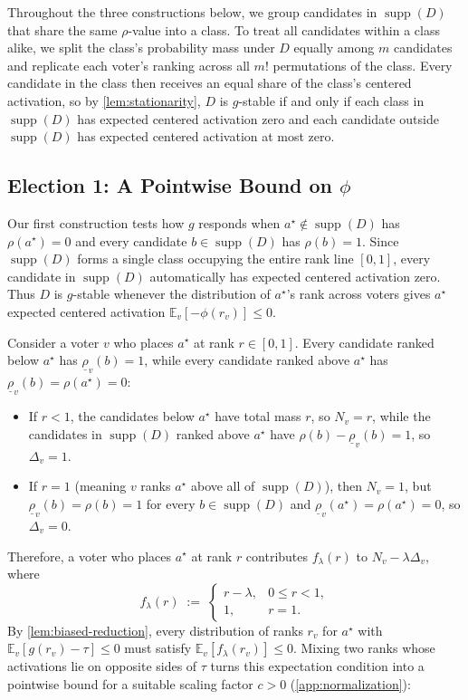 \documentclass[11pt]{article}
\numberwithin{equation}{section}
\theoremstyle{plain}
\theoremstyle{definition}
\newcommand{\E}{\mathbb{E}}
\newcommand{\1}{\mathbf{1}}
\newcommand{\lowrho}{\underline{\rho}}
\newcommand{\supp}{\operatorname{supp}}
\begin{document}
Throughout the three constructions below, we group candidates in $\supp(D)$ that share the same $\rho$-value into a class. To treat all candidates within a class alike, we split the class's probability mass under $D$ equally among $m$ candidates and replicate each voter's ranking across all $m!$ permutations of the class. Every candidate in the class then receives an equal share of the class's centered activation, so by \cref{lem:stationarity}, $D$ is $g$-stable if and only if each class in $\supp(D)$ has expected centered activation zero and each candidate outside $\supp(D)$ has expected centered activation at most zero.

\subsection{Election 1: A Pointwise Bound on \texorpdfstring{$\phi$}{phi}}
\label{sec:election-1}

Our first construction tests how $g$ responds when $a^\star \notin \supp(D)$ has $\rho(a^\star) = 0$ and every candidate $b \in \supp(D)$ has $\rho(b) = 1$. Since $\supp(D)$ forms a single class occupying the entire rank line $[0, 1]$, every candidate in $\supp(D)$ automatically has expected centered activation zero. Thus $D$ is $g$-stable whenever the distribution of $a^\star$'s rank across voters gives $a^\star$ expected centered activation $\E_v[-\phi(r_v)] \le 0$.

Consider a voter $v$ who places $a^\star$ at rank $r \in [0, 1]$. Every candidate ranked below $a^\star$ has $\lowrho_v(b) = 1$, while every candidate ranked above $a^\star$ has $\lowrho_v(b) = \rho(a^\star) = 0$:
\begin{itemize}
  \item If $r < 1$, the candidates below $a^\star$ have total mass $r$, so $N_v = r$, while the candidates in $\supp(D)$ ranked above $a^\star$ have $\rho(b) - \lowrho_v(b) = 1$, so $\Delta_v = 1$.
  \item If $r = 1$ (meaning $v$ ranks $a^\star$ above all of $\supp(D)$), then $N_v = 1$, but $\lowrho_v(b) = \rho(b) = 1$ for every $b \in \supp(D)$ and $\lowrho_v(a^\star) = \rho(a^\star) = 0$, so $\Delta_v = 0$.
\end{itemize}
Therefore, a voter who places $a^\star$ at rank $r$ contributes $f_\lambda(r)$ to $N_v - \lambda\Delta_v$, where
\[
  f_\lambda(r) \;:=\;
  \begin{cases}
    r - \lambda, & 0 \le r < 1, \\
    1, & r = 1.
  \end{cases}
\]
By \cref{lem:biased-reduction}, every distribution of ranks $r_v$ for $a^\star$ with $\E_v[g(r_v) - \tau] \le 0$ must satisfy $\E_v[f_\lambda(r_v)] \le 0$. Mixing two ranks whose activations lie on opposite sides of $\tau$ turns this expectation condition into a pointwise bound for a suitable scaling factor $c > 0$ (\cref{app:normalization}):
\end{document}

